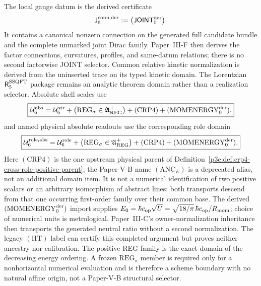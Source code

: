 \documentclass[12pt,a4paper]{article}
\newcommand{\Rconn}{\mathsf J_5^{\rm conn,der}}
\newcommand{\Rssqft}{\mathsf R_5^{\rm SSQFT}}
\newcommand{\JOINTfiveocc}{\mathsf{JOINT}_5^{\rm der}}
\newcommand{\Ubase}{\mathcal U_6^{\rm str}}
\newcommand{\Urole}{\mathcal U_6^{\rm role}}
\newcommand{\Uabs}{\mathcal U_6^{\rm abs}}
\newcommand{\Uroleabs}{\mathcal U_6^{\rm role,abs}}
\begin{document}
The local gauge datum is the derived certificate
\[
\Rconn:=\bigl(\JOINTfiveocc\bigr).
\]
It contains a canonical nonzero connection on the generated full candidate
bundle and the complete unmarked joint Dirac family.  Paper~III-F then derives the factor
connections, curvatures, profiles, and same-datum relations; there is no
second factorwise JOINT selector.  Common relative kinetic normalization is
derived from the uninserted trace on its typed kinetic domain.  The Lorentzian
\(\Rssqft\) package remains an analytic theorem domain rather than a
realization selector.  Absolute shell scales use
\begin{equation}
\label{p6:eq:absolute-upstream-domain}
\boxed{
\Uabs
=
\Ubase+
\bigl(\mathrm{REG}_{\sigma}\in\mathfrak A_{\rm REG}^{+}\bigr)
+(\mathrm{CRP4})+(\mathrm{MOMENERGY}_{0}^{\rm der}).
}
\end{equation}
and named physical absolute readouts use the corresponding role domain
\begin{equation}
\label{p6:eq:physical-role-absolute-domain}
\boxed{
\Uroleabs
=
\Urole+
\bigl(\mathrm{REG}_{\sigma}\in\mathfrak A_{\rm REG}^{+}\bigr)
+(\mathrm{CRP4})+(\mathrm{MOMENERGY}_{0}^{\rm der}).
}
\end{equation}
Here \((\mathrm{CRP4})\) is the one upstream physical parent of
Definition~\ref{p3e:def:crp4-cross-role-positive-parent}; the Paper-V-B name
\((\mathrm{ANC}_E)\) is a deprecated alias, not an additional domain item.
It is not a numerical identification of two positive scalars or an arbitrary
isomorphism of abstract lines: both transports descend from that one
occurring first-order family over their common base.  The derived
\((\mathrm{MOMENERGY}_{0}^{\rm der})\) import supplies
\(E_0=\hbar c_{\rm op}\sqrt U=\sqrt{18/\pi}\,\hbar c_{\rm op}/R_{\rm mom}\);
choice of numerical units is metrological.  Paper~III-C's
owner-normalization inheritance then transports the generated neutral ratio
without a second normalization.  The legacy \((\mathrm{HT})\) label can
certify this completed argument but proves neither ancestry nor calibration.
The positive REG family is the exact domain of the decreasing energy ordering.
A frozen \(\mathrm{REG}_{\sigma}\) member is required only for a
nonhorizontal numerical evaluation and is therefore a scheme boundary with no
natural affine origin, not a Paper-V-B structural selector.
\end{document}
